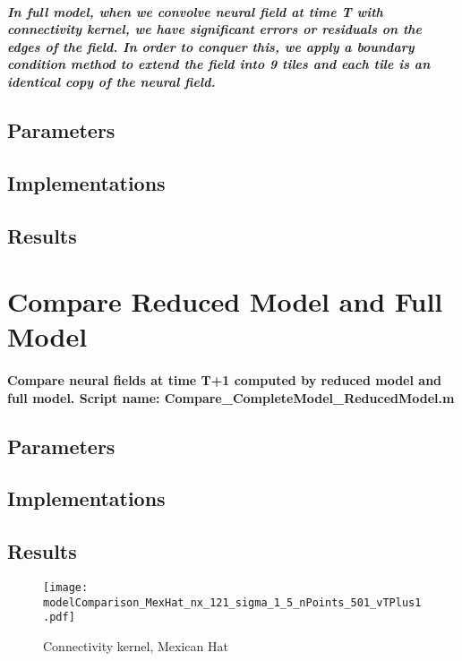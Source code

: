 \documentclass[a4paper, 12pt, english]{article}
\begin{document}
\subparagraph{In full model, when we convolve neural field at time T with connectivity kernel,
we have significant errors or residuals on the edges of the field. In order to conquer this,
we apply a boundary condition method to extend the field into 9 tiles and each tile is an identical copy
of the neural field.}

\subsection{Parameters}
\subsection{Implementations}
\subsection{Results}
\newpage


\section{Compare Reduced Model and Full Model}
\paragraph{Compare neural fields at time T+1 computed by reduced model and full model.\newline
Script name: Compare\_CompleteModel\_ReducedModel.m}
\subsection{Parameters}
\subsection{Implementations}
\subsection{Results}


\begin{figure}[H]
\centering
\texttt{[image: modelComparison\_MexHat\_nx\_121\_sigma\_1\_5\_nPoints\_501\_vTPlus1.pdf]}
\caption{Connectivity kernel, Mexican Hat}
\end{figure}
\end{document}
